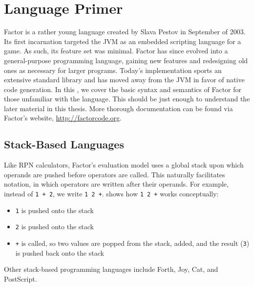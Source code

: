 \section{Language Primer}\label{sec:primer}


Factor is a rather young language created by Slava Pestov in September of 2003.
Its first incarnation targeted the \gls{JVM} as an embedded scripting language
for a game.  As such, its feature set was minimal.  Factor has since evolved
into a general-purpose programming language, gaining new features and
redesigning old ones as necessary for larger programs.  Today's implementation
sports an extensive standard library and has moved away from the \gls{JVM} in
favor of native code generation.  In this , we cover the
basic syntax and semantics of Factor for those unfamiliar with the language.
This should be just enough to understand the later material in this thesis.
More thorough documentation can be found via Factor's website,
\url{http://factorcode.org}.

\subsection{Stack-Based Languages}\label{sec:primer:stack-based}


Like \gls{RPN} calculators, Factor's evaluation model uses a global stack upon
which operands are pushed before operators are called.  This naturally
facilitates  notation, in which operators are written after their
operands.  For example, instead of \texttt{1~+~2}, we write \texttt{1~2~+}.
 shows how \texttt{1~2~+} works conceptually:
\begin{itemize}
  \item \texttt{1} is pushed onto the stack
  \item \texttt{2} is pushed onto the stack
  \item \texttt{+} is called, so two values are popped from the stack, added,
        and the result (\texttt{3}) is pushed back onto the stack
\end{itemize}
Other stack-based programming languages include Forth,
Joy, Cat, and PostScript.

